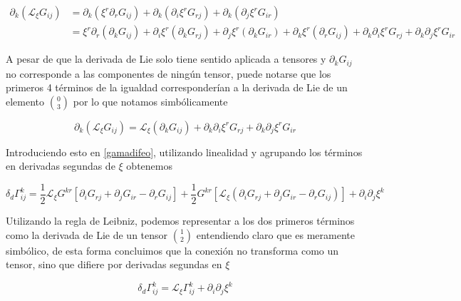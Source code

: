 \documentclass{article}
\numberwithin{equation}{section}
\begin{document}
\begin{equation*}
\begin{aligned}
\partial_k \left(\mathcal{L}_{\xi} G_{i j}\right) &= \partial_k \left(\xi^r \partial_r G_{i j}\right) + \partial_k  \left( \partial_i \xi^r G_{r j}\right) + \partial_k \left(\partial_ j \xi^r G_{i r}\right)\\
&= \xi^r \partial_r \left( \partial_k G_{i j} \right) + \partial_i \xi^r \left(\partial_k G_{r j}\right) + \partial_j \xi^r \left(\partial_k G_{i r}\right) + \partial_k \xi^r \left(\partial_r G_{i j}\right) + \partial_k \partial_i \xi^r G_{r j} + \partial_k \partial_j \xi^r G_{i r}
\end{aligned}
\end{equation*}

A pesar de que la derivada de Lie solo tiene sentido aplicada a tensores y $ \partial_k G_{i j} $ no corresponde a las componentes de ningún tensor, puede notarse que los primeros 4 términos de la igualdad corresponderían a la derivada de Lie de un elemento $ \binom{0}{3} $ por lo que notamos simbólicamente

\begin{equation}\label{liepart1}
\partial_k \left(\mathcal{L}_{\xi}  G_{i j}\right) = \mathcal{L}_{\xi} \left(\partial_k G_{i j}\right) + \partial_k \partial_i \xi^r G_{r j} + \partial_k \partial_j \xi^r G_{i r}
\end{equation}

Introduciendo esto en \ref{gamadifeo}, utilizando linealidad y agrupando los términos en derivadas segundas de $ \xi $ obtenemos

\begin{equation*}
\delta_d \Gamma^{k}_{i j} = \frac{1}{2}\mathcal{L}_{\xi} G^{k r}\left[ \partial_i G_{r j} + \partial_j G_{i r} - \partial_r G_{i j}\right] + \frac{1}{2}G^{k r}\left[ \mathcal{L}_{\xi} \left( \partial_i G_{r j} + \partial_j G_{i r} - \partial_r G_{i j}\right)\right] + \partial_i \partial_j \xi^k
\end{equation*}

Utilizando la regla de Leibniz, podemos representar a los dos primeros términos como la derivada de Lie de un tensor $ \binom{1}{2} $ entendiendo claro que es meramente simbólico, de esta forma concluimos que la conexión no transforma como un tensor, sino que difiere por derivadas segundas en $ \xi $

\begin{equation}\label{deltagama}
\delta_d \Gamma^{k}_{i j} = \mathcal{L}_{\xi} \Gamma^{k}_{i j}  + \partial_i \partial_j \xi^k
\end{equation}
\end{document}

